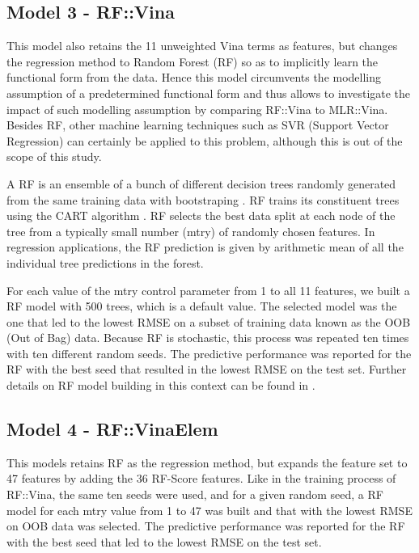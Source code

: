 \documentclass[twocolumn]{bmcart}
\begin{document}
\subsection*{Model 3 - RF::Vina}

This model also retains the 11 unweighted Vina terms as features, but changes the regression method to Random Forest (RF) \cite{1309} so as to implicitly learn the functional form from the data. Hence this model circumvents the modelling assumption of a predetermined functional form and thus allows to investigate the impact of such modelling assumption by comparing RF::Vina to MLR::Vina. Besides RF, other machine learning techniques such as SVR (Support Vector Regression) \cite{1295} can certainly be applied to this problem, although this is out of the scope of this study.

A RF is an ensemble of a bunch of different decision trees randomly generated from the same training data with bootstraping \cite{1309}. RF trains its constituent trees using the CART algorithm \cite{1310}. RF selects the best data split at each node of the tree from a typically small number (mtry) of randomly chosen features. In regression applications, the RF prediction is given by arithmetic mean of all the individual tree predictions in the forest.

For each value of the mtry control parameter from 1 to all 11 features, we built a RF model with 500 trees, which is a default value. The selected model was the one that led to the lowest RMSE on a subset of training data known as the OOB (Out of Bag) data. Because RF is stochastic, this process was repeated ten times with ten different random seeds. The predictive performance was reported for the RF with the best seed that resulted in the lowest RMSE on the test set. Further details on RF model building in this context can be found in \cite{1647}.

\subsection*{Model 4 - RF::VinaElem}

This models retains RF as the regression method, but expands the feature set to 47 features by adding the 36 RF-Score \cite{564} features. Like in the training process of RF::Vina, the same ten seeds were used, and for a given random seed, a RF model for each mtry value from 1 to 47 was built and that with the lowest RMSE on OOB data was selected. The predictive performance was reported for the RF with the best seed that led to the lowest RMSE on the test set.
\end{document}

